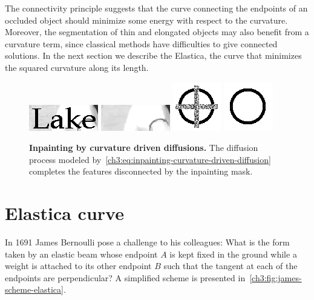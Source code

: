 The connectivity principle suggests that the curve connecting the endpoints of an occluded object should minimize some energy with respect to the curvature. Moreover, the segmentation of thin and elongated objects may also benefit from a curvature term, since classical methods have difficulties to give connected solutions. In the next section we describe the Elastica, the curve that minimizes the squared curvature along its length.

\begin{figure}
\center
\includegraphics[scale=1]{figures/chapter3/inpainting-cdd/lake-1.png}\hspace{0.5em}
\includegraphics[scale=1]{figures/chapter3/inpainting-cdd/lake-2.png}\hspace{3em}
\includegraphics[scale=0.6]{figures/chapter3/inpainting-cdd/circle-1.png}\hspace{0.5em}
\includegraphics[scale=0.6]{figures/chapter3/inpainting-cdd/circle-2.png}
\caption{\textbf{Inpainting by curvature driven diffusions.}\cite{chan01nontexture} The diffusion process modeled by~\cref{ch3:eq:inpainting-curvature-driven-diffusion} completes the features disconnected by the inpainting mask.}
\label{ch3:fig:inpainting-curvature-driven-diffusion}
\end{figure}



\section{Elastica curve}
\label{ch3:sec:elastica-curve}

In 1691 James Bernoulli pose a challenge to his colleagues: What is the form taken by an elastic beam whose endpoint $A$ is kept fixed in the ground while a weight is attached to its other endpoint $B$ such that the tangent at each of the endpoints are perpendicular? A simplified scheme is presented in~\cref{ch3:fig:james-scheme-elastica}.

